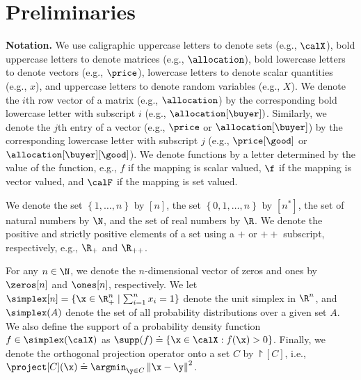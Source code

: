 \section{Preliminaries}
\label{sec:prelim}


\textbf{Notation.}
We use caligraphic uppercase letters to denote sets (e.g., $\calX$), bold uppercase letters to denote matrices (e.g., $\allocation$), bold lowercase letters to denote vectors (e.g., $\price$), lowercase letters to denote scalar quantities (e.g., $x$), and uppercase letters to denote random variables (e.g., $X$). 
We denote the $i$th row vector of a matrix (e.g., $\allocation$) by the corresponding bold lowercase letter with subscript $i$ (e.g., $\allocation[\buyer])$. 
Similarly, we denote the $j$th entry of a vector (e.g., $\price$ or $\allocation[\buyer]$) by the corresponding lowercase letter with subscript $j$ (e.g., $\price[\good]$ or $\allocation[\buyer][\good]$).
We denote functions by a letter determined by the value of the function, e.g., $f$ if the mapping is scalar valued, $\f$ if the mapping is vector valued, and $\calF$ if the mapping is set valued.

We denote the set $\left\{1, \hdots, n\right\}$ by $[n]$, the set $\left\{0, 1, \hdots, n\right\}$ by $[n^*]$, the set of natural numbers by $\N$, and the set of real numbers by $\R$. 
We denote the positive and strictly positive elements of a set using a $+$ or $++$ subscript, respectively, e.g., $\R_+$ and $\R_{++}$.

For any $n \in \N$, we denote the  $n$-dimensional vector of zeros and ones by $\zeros[n]$ and $\ones[n]$, respectively.
We let $\simplex[n] = \{\x \in \R_+^n \mid \sum_{i = 1}^n x_i = 1 \}$ denote the unit simplex in $\R^n$, and $\simplex(A)$ denote the set of all probability distributions over a given set $A$.
We also define the support of a probability density function $f \in \simplex(\calX)$ as $\supp(f) \doteq \left\{ \x \in \calX: f(\x) > 0 \right\}$.
%
Finally, we denote the orthogonal projection operator onto a set $C$ by $\project[C]$, i.e., $\project[C](\x) \doteq \argmin_{\y \in C} \left\|\x - \y \right\|^2$.


%


